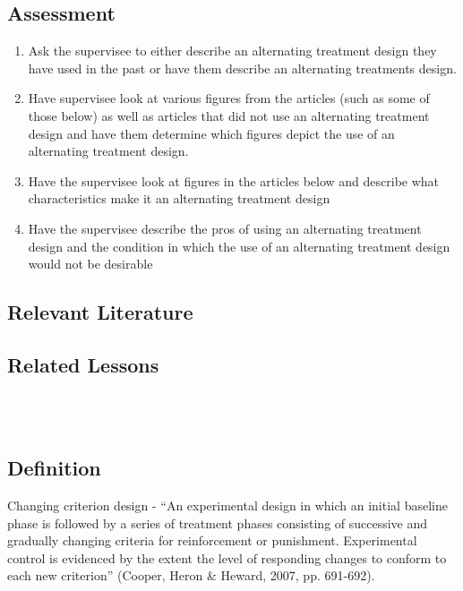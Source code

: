 \subsection{Assessment}
\begin{enumerate}
\item Ask the supervisee to either describe an alternating treatment design they have used in the past or have them describe an alternating treatments design.
\item Have supervisee look at various figures  from the articles (such as some of those below) as well as articles that did not use an alternating treatment design and have them determine which figures depict the use of an alternating treatment design. 
\item Have the supervisee look at figures in the articles below and describe what characteristics make it an alternating treatment design
\item Have the supervisee describe the pros of using an alternating treatment design and the condition in which the use of an alternating treatment design would not be desirable
\end{enumerate}
%
\subsection{Relevant Literature}
\begin{refsection}
\nocite{barbetta1993effects,
    barlow1979alternating,
    cooper2007applied,
    iwata1994toward,
    martens1992effects,
    singh1985comparison,
    ulman1975multielement}
\printbibliography[heading=none]
\end{refsection}
%
\subsection{Related Lessons} 
\fourbThree{}\\ 
\fourjNine{}\\
%
\subsection{Definition} 
Changing criterion design - ``An experimental design in which an initial baseline phase is followed by a series of treatment phases consisting of successive and gradually changing criteria for reinforcement or punishment. Experimental control is evidenced by the extent the level of responding changes to conform to each new criterion'' (Cooper, Heron \& Heward, 2007, pp. 691-692).


